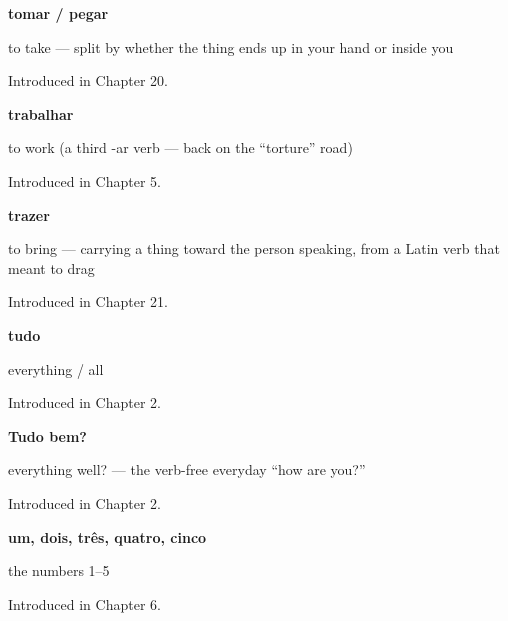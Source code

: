 \noindent\begin{minipage}[t]{\linewidth}
\raggedright
\textbf{tomar / pegar}\par
\small to take — split by whether the thing ends up in your hand or inside you\par
\footnotesize Introduced in Chapter 20.
\end{minipage}\par\medskip

\noindent\begin{minipage}[t]{\linewidth}
\raggedright
\textbf{trabalhar}\par
\small to work (a third -ar verb — back on the \textquotedblleft{}torture\textquotedblright{} road)\par
\footnotesize Introduced in Chapter 5.
\end{minipage}\par\medskip

\noindent\begin{minipage}[t]{\linewidth}
\raggedright
\textbf{trazer}\par
\small to bring — carrying a thing toward the person speaking, from a Latin verb that meant to drag\par
\footnotesize Introduced in Chapter 21.
\end{minipage}\par\medskip

\noindent\begin{minipage}[t]{\linewidth}
\raggedright
\textbf{tudo}\par
\small everything / all\par
\footnotesize Introduced in Chapter 2.
\end{minipage}\par\medskip

\noindent\begin{minipage}[t]{\linewidth}
\raggedright
\textbf{Tudo bem?}\par
\small everything well? — the verb-free everyday “how are you?”\par
\footnotesize Introduced in Chapter 2.
\end{minipage}\par\medskip

\noindent\begin{minipage}[t]{\linewidth}
\raggedright
\textbf{um, dois, três, quatro, cinco}\par
\small the numbers 1–5\par
\footnotesize Introduced in Chapter 6.
\end{minipage}\par\medskip

